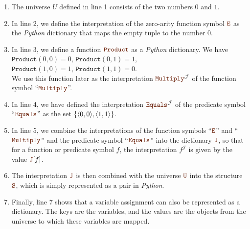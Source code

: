 \begin{enumerate}
\item The universe $U$ defined in line 1 consists of the two numbers $0$ and $1$.
      
\item In line 2, we define the interpretation of the zero-arity function symbol $\mytt{E}$
      as the \textsl{Python} dictionary that maps the empty tuple to the number $0$.
\item In line 3, we define a function $\mytt{Product}$ as a \textsl{Python} dictionary.  We have
      \\[0.2cm]
      \hspace*{1.3cm}
      $\mathtt{Product}(0,0) = 0$, \quad
      $\mathtt{Product}(0,1) = 1$, 
      \\[0.2cm]
      \hspace*{1.3cm}
      $\mathtt{Product}(1,0) = 1$, \quad
      $\mathtt{Product}(1,1) = 0$.
      \\[0.2cm]  
      We use this function later as the interpretation $\mytt{Multiply}^\mathcal{J}$ of the function symbol ``$\mytt{Multiply}$''.
\item In line 4, we have defined the interpretation $\mytt{Equals}^\mathcal{J}$ of
      the predicate symbol ``$\mytt{Equals}$'' as the set $\{ \pair(0,0), \pair(1,1)\}$.
\item In line 5, we combine the interpretations of the function symbols ``$\mytt{E}$'' and
      ``$\mytt{Multiply}$'' and the predicate symbol ``$\mytt{Equals}$'' into the dictionary $\mytt{J}$,
      so that for a function or predicate symbol $f$, the interpretation $f^\mathcal{J}$ is given by
      the value $\mytt{J}[f]$.
\item The interpretation $\mytt{J}$ is then combined with the
      universe $\mytt{U}$ into the structure $\mytt{S}$, which is simply represented as
      a pair in \textsl{Python}.
\item Finally, line 7 shows that a
      variable assignment can also be represented as a dictionary. The keys
      are the variables, and the values are the objects from the universe to which these variables
      are mapped.
\end{enumerate}



